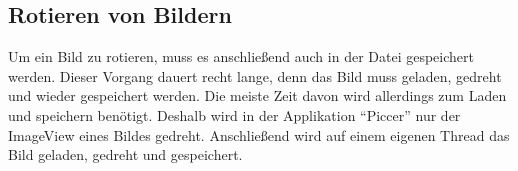 \subsection{Rotieren von Bildern}
Um ein Bild zu rotieren, muss es anschließend auch in der Datei gespeichert werden.
Dieser Vorgang dauert recht lange, denn das Bild muss geladen, gedreht und wieder gespeichert werden.
Die meiste Zeit davon wird allerdings zum Laden und speichern benötigt.
Deshalb wird in der Applikation \enquote{Piccer} nur der ImageView eines Bildes gedreht.
Anschließend wird auf einem eigenen Thread das Bild geladen, gedreht und gespeichert.
